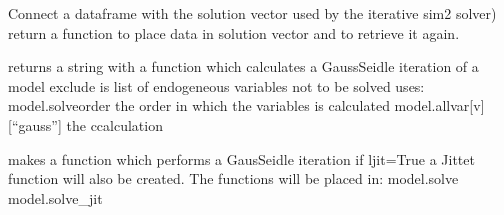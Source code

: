 \documentclass[letterpaper,10pt,english]{sphinxmanual}
\begin{document}
\begin{fulllineitems}
\begin{fulllineitems}
\end{fulllineitems}


\begin{fulllineitems}
\label{\detokenize{core/modelclass:modelclass.BaseModel.createstuff3}}
\pysigstartsignatures
{}
\pysigstopsignatures
\sphinxAtStartPar
Connect a dataframe with the solution vector used by the iterative sim2 solver)
return a function to place data in solution vector and to retrieve it again.

\end{fulllineitems}


\begin{fulllineitems}
\label{\detokenize{core/modelclass:modelclass.BaseModel.outsolve}}
\pysigstartsignatures
{}
\pysigstopsignatures
\sphinxAtStartPar
returns a string with a function which calculates a
Gauss\sphinxhyphen{}Seidle iteration of a model
exclude is list of endogeneous variables not to be solved
uses:
model.solveorder the order in which the variables is calculated
model.allvar{[}v{]}{[}“gauss”{]} the ccalculation

\end{fulllineitems}


\begin{fulllineitems}
\label{\detokenize{core/modelclass:modelclass.BaseModel.make_solver}}
\pysigstartsignatures
{}
\pysigstopsignatures
\sphinxAtStartPar
makes a function which performs a Gaus\sphinxhyphen{}Seidle iteration
if ljit=True a Jittet function will also be created.
The functions will be placed in:
model.solve
model.solve\_jit


\end{fulllineitems}
\end{fulllineitems}
\end{document}
